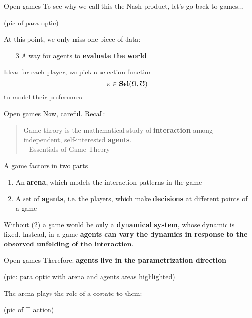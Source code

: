 \begin{frame}{Open games}
	To see why we call this the Nash product, let's go back to games...

	(pic of para optic)

	At this point, we only miss one piece of data:
	\begin{enumerate}
		\item[3] A way for agents to \textbf{evaluate the world}
	\end{enumerate}

	\vfill
	Idea: for each player, we pick a selection function
	\begin{equation*}
		\varepsilon \in \mathbf{Sel}(\Omega, \mho)
	\end{equation*}
	to model their preferences
\end{frame}

\begin{frame}{Open games}
	Now, careful. Recall:

	\vfill
	\begin{quotation}
		Game theory is the mathematical study of \textbf{interaction} among independent, self-interested \textbf{agents}.\\
		{\color{colornote}-- Essentials of Game Theory \cite{eogt}}
	\end{quotation}


	A game factors in two parts
	\begin{enumerate}
		\item An \textbf{arena}, which models the {interaction patterns} in the game
		\item A set of \textbf{agents}, i.e. the players, which make \textbf{decisions} at different points of a game
	\end{enumerate}

	Without (2) a game would be only a \textbf{dynamical system}, whose dynamic is fixed.
	Instead, in a game \textbf{agents can vary the dynamics in response to the observed unfolding of the interaction}.
\end{frame}

\begin{frame}{Open games}
	Therefore: \textbf{agents live in the parametrization direction}

	(pic: para optic with arena and agents areas highlighted)

	The arena plays the role of a costate to them:

	(pic of $\top$ action)
\end{frame}

